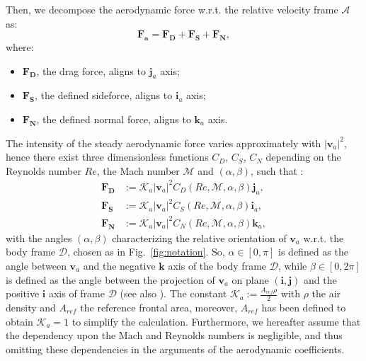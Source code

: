 Then, we decompose the aerodynamic force w.r.t. the relative velocity frame $\mathcal{A}$ as:
\begin{equation}
\label{eq:af_total_control}
\boldsymbol{{F}_a}=\boldsymbol{{F}_D}+\boldsymbol{{F}_S}+\boldsymbol{{F}_N} ,
\end{equation}
where:
\begin{itemize}
    \item $\boldsymbol{{F}_D}$, the drag force, aligns to $\boldsymbol{j}_a$ axis;
    \item $\boldsymbol{{F}_S}$, the defined sideforce, aligns to $\boldsymbol{i}_a$ axis;
    \item $\boldsymbol{{F}_N}$, the defined normal force, aligns to $\boldsymbol{k}_a$ axis.
\end{itemize}
The intensity of the steady aerodynamic force varies approximately with $|\boldsymbol{v}_a|^2$, hence there exist three dimensionless functions $C_D$, $C_S$, $C_N$ depending on the Reynolds number $Re$, the Mach number $\mathcal{M}$ and $(\alpha, \beta)$, such that \cite{pucci2015nonlinear}\cite{stengel2015flight}:
\begin{subequations}
\begin{align}
    \boldsymbol{{F}_D} & :=\mathcal{K}_a|\boldsymbol{v}_a|^2C_D(Re, \mathcal{M}, \alpha, \beta)\boldsymbol{j}_a,\\
    \boldsymbol{{F}_S} & :=\mathcal{K}_a|\boldsymbol{v}_a|^2C_S(Re, \mathcal{M}, \alpha, \beta)\boldsymbol{i}_a,\\
    \boldsymbol{{F}_N} & :=\mathcal{K}_a|\boldsymbol{v}_a|^2C_N(Re, \mathcal{M}, \alpha, \beta)\boldsymbol{k}_a,
\end{align}
\label{eq:af_coe}
\end{subequations}
\noindent with the angles $(\alpha, \beta)$ characterizing the relative orientation of $\boldsymbol{v}_a$ w.r.t. the body frame $\mathcal{D}$, chosen as in  Fig.~\ref{fig:notation}. So, $\alpha \in [0,\pi]$ is defined as the angle between $\boldsymbol{v}_a$ and the negative $\boldsymbol{k}$ axis of the body frame $\mathcal{D}$, while $\beta \in [0,2\pi]$ is defined as the angle between the projection of $\boldsymbol{v}_a$ on plane $(\boldsymbol{i},\boldsymbol{j})$ and the positive $\boldsymbol{i}$ axis of frame $\mathcal{D}$ (see also \cite{pucci2015nonlinear}). The constant $\mathcal{K}_a:=\frac{A_{ref}\rho}{2}$ with $\rho$ the air density and $A_{ref}$ the reference frontal area, moreover, $A_{ref}$ has been defined to obtain $\mathcal{K}_a = 1$ to simplify the calculation. Furthermore, we hereafter assume that the dependency upon the Mach and Reynolds numbers is negligible, and thus omitting these dependencies in the arguments of the aerodynamic coefficients.

